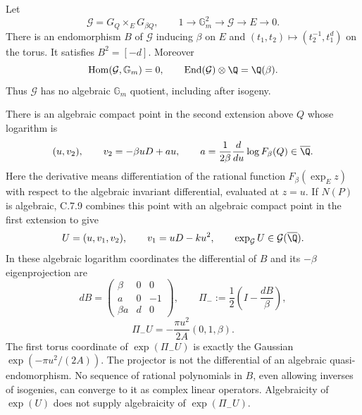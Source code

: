 \begin{statement}
Let
\[
 \mathcal G=G_Q\mathbin{\times_E}G_{\beta Q},\qquad
 1\longrightarrow\mathbb G_m^2\longrightarrow\mathcal G
       \longrightarrow E\longrightarrow0.
\]
There is an endomorphism $B$ of $\mathcal G$ inducing
$\beta$ on $E$ and
$(t_1,t_2)\mapsto(t_2^{-1},t_1^d)$ on the torus.
It satisfies $B^2=[-d]$. Moreover
\[
 \operatorname{Hom}(\mathcal G,\mathbb G_m)=0,
 \qquad
 \operatorname{End}(\mathcal G)\otimes\Q=\Q(\beta).
\]
Thus $\mathcal G$ has no algebraic $\mathbb G_m$ quotient,
including after isogeny.

There is an algebraic compact point in the second extension
above $Q$ whose logarithm is
\[
 (u,v_2),\qquad v_2=-\beta uD+au,
 \qquad
 a=\frac1{2\beta}
       \frac{d}{du}\log F_\beta(Q)\in\overline\Q.
\]
Here the derivative means differentiation of the rational
function $F_\beta(\exp_E z)$ with respect to the algebraic
invariant differential, evaluated at $z=u$.
If $N(P)$ is algebraic, C.7.9 combines this point with an
algebraic compact point in the first extension to give
\[
 U=(u,v_1,v_2),\qquad v_1=uD-ku^2,
 \qquad \exp_{\mathcal G}U\in\mathcal G(\overline\Q).
\]
In these algebraic logarithm coordinates the differential of
$B$ and its $-\beta$ eigenprojection are
\[
 dB=\begin{pmatrix}
 \beta&0&0\\ a&0&-1\\ \beta a&d&0
 \end{pmatrix},\qquad
 \Pi_-:=\frac12\left(I-\frac{dB}{\beta}\right),
\]
\[
 \Pi_-U=-\frac{\pi u^2}{2A}(0,1,\beta).
\]
The first torus coordinate of $\exp(\Pi_-U)$ is exactly
the Gaussian $\exp(-\pi u^2/(2A))$. The projector is not
the differential of an algebraic quasi-endomorphism. No
sequence of rational polynomials in $B$, even allowing
inverses of isogenies, can converge to it as complex linear
operators. Algebraicity of $\exp(U)$ does not supply
algebraicity of $\exp(\Pi_-U)$.
\end{statement}
